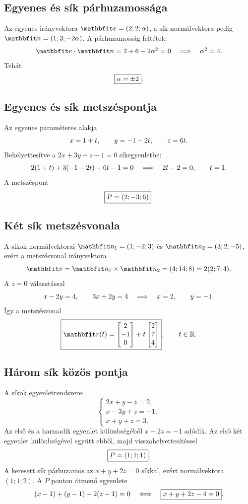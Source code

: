 \documentclass{szb-solution}
\begin{document}
\subsection{Egyenes és sík párhuzamossága}

Az egyenes irányvektora $\rvec v=(2;2;\alpha)$, a sík normálvektora pedig
$\rvec n=(1;3;-2\alpha)$. A párhuzamosság feltétele
$$
  \rvec v\cdot\rvec n
  =2+6-2\alpha^2=0
  \quad\Longrightarrow\quad
  \alpha^2=4
  \text.
$$
Tehát
$$
  \boxed{\alpha=\pm2}
  \text.
$$

\subsection{Egyenes és sík metszéspontja}

Az egyenes paraméteres alakja
$$
  x=1+t,
  \qquad y=-1-2t,
  \qquad z=6t
  \text.
$$
Behelyettesítve a $2x+3y+z-1=0$ síkegyenletbe:
$$
  2(1+t)+3(-1-2t)+6t-1=0
  \quad\Longrightarrow\quad
  2t-2=0,
  \qquad t=1
  \text.
$$
A metszéspont
$$
  \boxed{P=(2;-3;6)}
  \text.
$$

\subsection{Két sík metszésvonala}

A síkok normálvektorai $\rvec n_1=(1;-2;3)$ és
$\rvec n_2=(3;2;-5)$, ezért a metszésvonal irányvektora
$$
  \rvec v=\rvec n_1\times\rvec n_2=(4;14;8)=2(2;7;4)
  \text.
$$
A $z=0$ választással
$$
  x-2y=4,
  \qquad 3x+2y=4
  \quad\Longrightarrow\quad
  x=2,
  \qquad y=-1
  \text.
$$
Így a metszésvonal
$$
  \boxed{
    \rvec r(t)=
    \begin{bmatrix}2\\-1\\0\end{bmatrix}
    +t\begin{bmatrix}2\\7\\4\end{bmatrix}
  },
  \qquad t\in\Reals
  \text.
$$

\subsection{Három sík közös pontja}

A síkok egyenletrendszere:
$$
  \begin{cases}
    2x+y-z=2,\\
    x-3y+z=-1,\\
    x+y+z=3.
  \end{cases}
$$
Az első és a harmadik egyenlet különbségéből $x-2z=-1$ adódik. Az első két
egyenlet különbségével együtt ebből, majd visszahelyettesítéssel
$$
  \boxed{P=(1;1;1)}
  \text.
$$
A keresett sík párhuzamos az $x+y+2z=0$ síkkal, ezért normálvektora
$(1;1;2)$. A $P$ ponton átmenő egyenlete
$$
  (x-1)+(y-1)+2(z-1)=0
  \quad\Longleftrightarrow\quad
  \boxed{x+y+2z-4=0}
  \text.
$$
\end{document}
